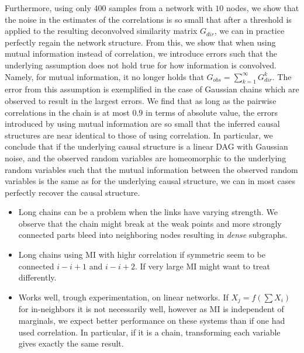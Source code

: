\documentclass[../Thesis.tex]{subfiles}
\begin{document}
Furthermore, using only $400$ samples from a network with $10$ nodes, we show that the noise in the estimates of the correlations is so small that after a threshold is applied to the resulting deconvolved similarity matrix $G_{dir}$, we can in practice perfectly regain the network structure. From this, we show that when using mutual information instead of correlation, we introduce errors such that the underlying assumption does not hold true for how information is convolved. Namely, for mutual information, it no longer holds that $G_{obs} = \sum_{k = 1}^{\infty} G_{dir}^k$. The error from this assumption is exemplified in the case of Gaussian chains which are observed to result in the largest errors. We find that as long as the pairwise correlations in the chain is at most $0.9$ in terms of absolute value, the errors introduced by using mutual information are so small that the inferred causal structures are near identical to those of using correlation. In particular, we conclude that if the underlying causal structure is a linear DAG with Gaussian noise, and the observed random variables are homeomorphic to the underlying random variables such that the mutual information between the observed random variables is the same as for the underlying causal structure, we can in most cases perfectly recover the causal structure. 





\begin{itemize}
    \item Long chains can be a problem when the links have varying strength. We observe that the chain might break at the weak points and more strongly connected parts bleed into neighboring nodes resulting in \textit{dense} subgraphs.
    \item Long chains using MI with highr correlation if symmetric seem to be connected $i - i+1$ and $i - i+2$. If very large MI might want to treat differently.
    \item Works well, trough experimentation, on linear networks. If $X_j = f(\sum X_i)$ for in-neighbors it is not necessarily well, however as MI is independent of marginals, we expect better performance on these systems than if one had used correlation. In particular, if it is a chain, transforming each variable gives exactly the same result.
\end{itemize}
\end{document}
